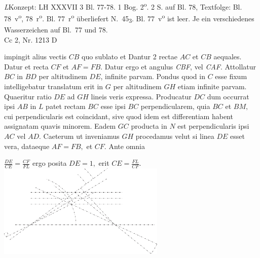 \begin{Ueberlieferung}%
{\textit{L}}Konzept: LH XXXVII 3 Bl. 77-78. 1 Bog. 2\textsuperscript{o}. 2 S. auf Bl. 78, Textfolge: Bl. 78~v\textsuperscript{o}, 78~r\textsuperscript{o}.
Bl. 77~r\textsuperscript{o} überliefert N.~45\textsubscript{3}.
Bl. 77~v\textsuperscript{o} ist leer. 
Je ein verschiedenes Wasserzeichen auf Bl.~77 und 78.\\%
Cc 2, Nr. 1213 D
\end{Ueberlieferung}
%
\vspace*{8mm}
%
\count{}
\count{}
\count{}
\pstart%
\noindent%
[78~v\textsuperscript{o}]
%
impingit alius vectis\protect{} $CB$ quo sublato et 
Dantur 2 rectae $AC$ et $CB$ aequales. Datur et recta $CF$ et $AF=FB$. Datur ergo et angulus \textit{CBF}, vel \textit{CAF}. Attollatur $BC$ in $BD$ per altitudinem $DE$, infinite parvam. Pondus\protect{} quod in $C$ esse fixum intelligebatur translatum erit in $G$ per altitudinem $GH$ etiam infinite parvam. Quaeritur ratio $DE$ ad $GH$ lineis veris expressa.
\pend
\pstart
Producatur $DC$ dum occurrat ipsi $AB$ in $L$ patet rectam $BC$ esse ipsi $BC$
perpendicularem, quia $BC$ et $BM,$ cui perpendicularis est coincidant, sive quod idem est differentiam habent assignatam quavis minorem. Eadem $GC$ producta in $N$ est perpendicularis ipsi $AC$ vel $AD$.
\pend
\pstart
Caeterum ut inveniamus $GH$ procedamus velut si linea $DE$ esset vera, dataeque $AF=FB,$ et $CF.$ Ante omnia \rule[-4mm]{0mm}{10mm}$\displaystyle\frac{DE}{CE}=\frac{CF}{FL}$
ergo posita $DE=1,$ erit
$\displaystyle CE=\frac{FL}{CF}.$
\pend
\vspace{1em}
\pstart
\centering
\includegraphics[width=0.6\textwidth]{images/LH037,03_078v-d1.pdf}\\
